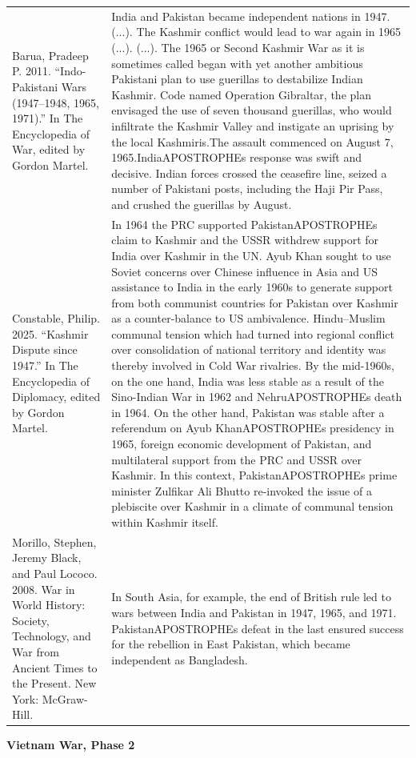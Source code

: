 {\begin{longtable}{p{}p{}}
\\
Barua, Pradeep P. 2011. “Indo-Pakistani Wars (1947–1948, 1965, 1971).” In The Encyclopedia of War, edited by Gordon Martel. & India and Pakistan became independent nations in 1947. (...). The Kashmir conflict would lead to war again in 1965 (...). (...). 
The 1965 or Second Kashmir War as it is sometimes called began with yet another ambitious Pakistani plan to use guerillas to destabilize Indian Kashmir. Code named Operation Gibraltar, the plan envisaged the use of seven thousand guerillas, who would infiltrate the Kashmir Valley and instigate an uprising by the local Kashmiris.The assault commenced on August 7, 1965.IndiaAPOSTROPHEs response was swift and decisive. Indian forces crossed the ceasefire line, seized a number of Pakistani posts, including the Haji Pir Pass, and crushed the guerillas by August.
\\
Constable, Philip. 2025. “Kashmir Dispute since 1947.” In The Encyclopedia of Diplomacy, edited by Gordon Martel. & In 1964 the PRC supported PakistanAPOSTROPHEs claim to Kashmir and the USSR withdrew support for India over Kashmir in the UN. Ayub Khan sought to use Soviet concerns over Chinese influence in Asia and US assistance to India in the early 1960s to generate support from both communist countries for Pakistan over Kashmir as a counter-balance to US ambivalence. Hindu–Muslim communal tension which had turned into regional conflict over consolidation of national territory and identity was thereby involved in Cold War rivalries. By the mid-1960s, on the one hand, India was less stable as a result of the Sino-Indian War in 1962 and NehruAPOSTROPHEs death in 1964. On the other hand, Pakistan was stable after a referendum on Ayub KhanAPOSTROPHEs presidency in 1965, foreign economic development of Pakistan, and multilateral support from the PRC and USSR over Kashmir. In this context, PakistanAPOSTROPHEs prime minister Zulfikar Ali Bhutto re-invoked the issue of a plebiscite over Kashmir in a climate of communal tension within Kashmir itself.
\\
Morillo, Stephen, Jeremy Black, and Paul Lococo. 2008. War in World History: Society, Technology, and War from Ancient Times to the Present. New York: McGraw-Hill. & In South Asia, for example, the end of British rule led to wars between India and Pakistan in 1947, 1965, and 1971. PakistanAPOSTROPHEs defeat in the last ensured success for the rebellion in East Pakistan, which became independent as Bangladesh.
\\
\end{longtable}}
\clearpage
         \textbf{Vietnam War, Phase 2} 

